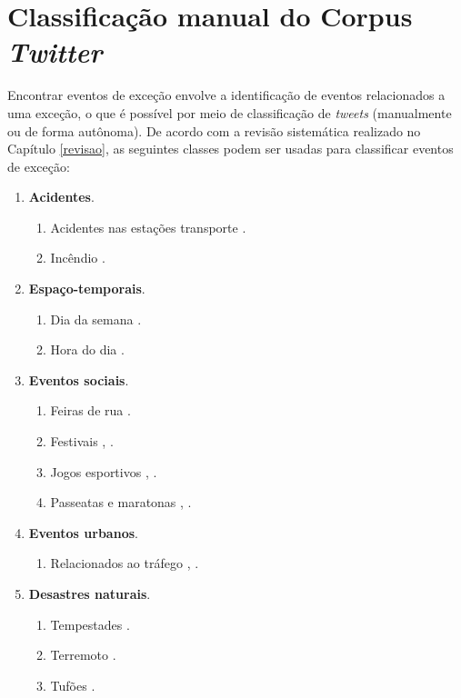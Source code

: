 \documentclass[
	12pt,				%
	oneside,			%
	a4paper,			%
	english,			%
	brazil				%
	]{abntex2ppgsi}
\begin{document}
{{\section{Classificação manual do Corpus \textit{Twitter}}
\label{manualClassification}

Encontrar eventos de exceção envolve a identificação de eventos relacionados a uma exceção, o que é possível por meio de classificação de \textit{tweets} (manualmente ou de forma autônoma). De acordo com a revisão sistemática realizado no Capítulo \ref{revisao}, as seguintes classes podem ser usadas para classificar eventos de exceção:

\begin{enumerate}
\item \textbf{Acidentes}.
\begin{enumerate}
\item Acidentes nas estações transporte \cite{Itoh2016}.
\item Incêndio \cite{Itoh2016}.
\end{enumerate}

\item \textbf{Espaço-temporais}.
\begin{enumerate}
\item Dia da semana \cite{Chen2016}.
\item Hora do dia \cite{Chen2016}.
\end{enumerate}

\item \textbf{Eventos sociais}.
\begin{enumerate}
\item Feiras de rua \cite{Chen2016}.
\item Festivais \cite{Chen2016}, \cite{Lecue2014}.
\item Jogos esportivos \cite{Chen2016}, \cite{Gal-Tzur2014}.
\item Passeatas e maratonas \cite{Chen2016}, \cite{Itoh2016}.
\end{enumerate}

\item \textbf{Eventos urbanos}.
\begin{enumerate}
\item Relacionados ao tráfego \cite{Chen2016}, \cite{Lecue2014}.
\end{enumerate}

\item \textbf{Desastres naturais}.
\begin{enumerate}
\item Tempestades \cite{Itoh2016}.
\item Terremoto \cite{Itoh2016}.
\item Tufões \cite{Itoh2016}.
\end{enumerate}


\end{enumerate}}}
\end{document}
